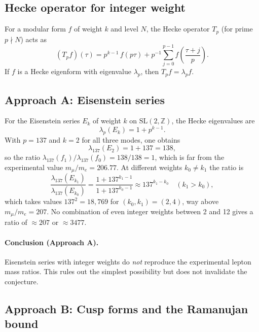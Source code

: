 \documentclass[12pt,a4paper]{article}
\theoremstyle{remark}
\newcommand{\Z}{\mathbb{Z}}
\newcommand{\SL}{\mathrm{SL}}
\begin{document}
\subsection{Hecke operator for integer weight}

For a modular form $f$ of weight $k$ and level $N$, the Hecke operator $T_p$
(for prime $p\nmid N$) acts as
\begin{equation}
  \label{eq:hecke_def}
  (T_p f)(\tau)
  = p^{k-1}\,f(p\tau)
  + p^{-1}\sum_{j=0}^{p-1} f\!\left(\frac{\tau+j}{p}\right).
\end{equation}
If $f$ is a Hecke eigenform with eigenvalue $\lambda_p$, then $T_p f = \lambda_p f$.

\subsection{Approach A: Eisenstein series}

For the Eisenstein series $E_k$ of weight $k$ on $\SL(2,\Z)$, the Hecke
eigenvalues are
\begin{equation}
  \label{eq:eisenstein_hecke}
  \lambda_p(E_k) = 1 + p^{k-1}.
\end{equation}
With $p=137$ and $k=2$ for all three modes, one obtains
\begin{equation}
  \lambda_{137}(E_2) = 1 + 137 = 138,
\end{equation}
so the ratio $\lambda_{137}(f_1)/\lambda_{137}(f_0) = 138/138 = 1$,
which is far from the experimental value $m_\mu/m_e = 206.77$.
At different weights $k_0 \neq k_1$ the ratio is
\begin{equation}
  \frac{\lambda_{137}(E_{k_1})}{\lambda_{137}(E_{k_0})}
  = \frac{1+137^{k_1-1}}{1+137^{k_0-1}}
  \approx 137^{k_1-k_0}
  \quad(k_1 > k_0),
\end{equation}
which takes values $137^2 = 18{,}769$ for $(k_0,k_1)=(2,4)$,
way above $m_\mu/m_e = 207$.  No combination of even integer weights
between 2 and 12 gives a ratio of $\approx 207$ or $\approx 3477$.

\paragraph{Conclusion (Approach A).}
Eisenstein series with integer weights do \emph{not} reproduce the
experimental lepton mass ratios.  This rules out the simplest possibility
but does not invalidate the conjecture.

\subsection{Approach B: Cusp forms and the Ramanujan bound}
\end{document}
